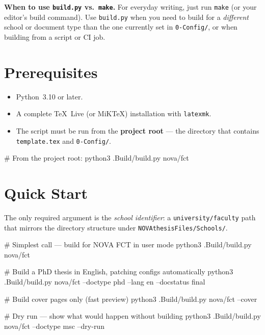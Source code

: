 \medskip\noindent
\textbf{When to use \texttt{build.py} vs.\ \texttt{make}.}  For everyday
writing, just run \texttt{make} (or your editor's build command).
Use \texttt{build.py} when you need to build for a \emph{different} school
or document type than the one currently set in \verb!0-Config/!, or when
building from a script or CI job.


\section{Prerequisites}
\label{sec:buildpy_prereqs}

\begin{itemize}
  \item Python~3.10 or later.
  \item A complete \TeX~Live (or MiK\TeX) installation with \texttt{latexmk}.
  \item The script must be run from the \textbf{project root} — the directory
        that contains \verb!template.tex! and \verb!0-Config/!.
\end{itemize}

\begin{bashcode}
# From the project root:
python3 .Build/build.py nova/fct
\end{bashcode}


\section{Quick Start}
\label{sec:buildpy_quickstart}

The only required argument is the \emph{school identifier}: a
\verb!university/faculty! path that mirrors the directory structure under
\verb!NOVAthesisFiles/Schools/!.

\begin{bashcode}
# Simplest call — build for NOVA FCT in user mode
python3 .Build/build.py nova/fct

# Build a PhD thesis in English, patching configs automatically
python3 .Build/build.py nova/fct --doctype phd --lang en --docstatus final

# Build cover pages only (fast preview)
python3 .Build/build.py nova/fct --cover

# Dry run — show what would happen without building
python3 .Build/build.py nova/fct --doctype msc --dry-run
\end{bashcode}

